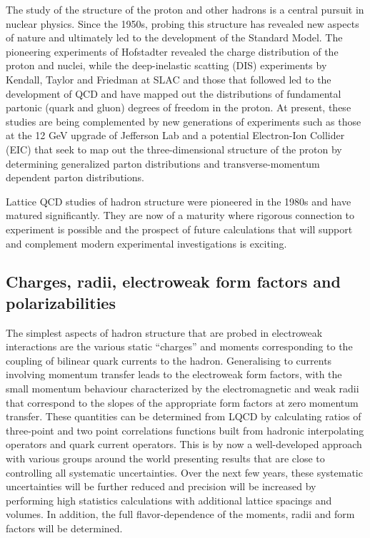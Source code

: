 
The study of the structure of the proton and other hadrons is a central pursuit in nuclear physics. Since the 1950s, probing this structure has revealed new aspects of nature and ultimately led to the development of the Standard Model. The pioneering experiments of Hofstadter revealed the charge distribution of the proton and nuclei, while the deep-inelastic scatting (DIS) experiments by Kendall, Taylor and Friedman at SLAC and those that followed led to the development of QCD and have mapped out  the distributions of fundamental partonic (quark and gluon) degrees of freedom in the proton. At present, these studies are being complemented by new generations of experiments such as those at the 12 GeV upgrade of Jefferson Lab and a potential Electron-Ion Collider (EIC) that seek to map out the three-dimensional structure of the proton by determining generalized parton distributions and transverse-momentum dependent parton distributions. 

Lattice QCD studies of hadron structure were pioneered in the 1980s and have matured significantly. They are now of a maturity where  rigorous connection to experiment is possible and the prospect of future calculations that will support and complement modern experimental investigations is exciting.


\subsection{Charges, radii,  electroweak form factors and polarizabilities}


The simplest aspects of hadron structure that are probed in electroweak interactions are the various static ``charges'' and moments corresponding to the coupling of bilinear quark currents to the hadron. Generalising to currents involving momentum transfer leads to the  electroweak form factors, with the small momentum behaviour characterized by the electromagnetic and weak radii that correspond to the slopes of the appropriate form factors at zero momentum transfer. These quantities can be determined from LQCD by calculating ratios of three-point and two point correlations functions built from hadronic interpolating operators and quark current operators. This is by now a well-developed approach with various groups around the world presenting results that are close to controlling all systematic uncertainties. Over the next few years, these systematic uncertainties will be further reduced  and  precision will be increased by performing high statistics calculations with additional lattice spacings and volumes. In addition, the full flavor-dependence of the moments, radii and form factors will be determined. 

